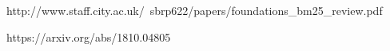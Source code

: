 
http://www.staff.city.ac.uk/~sbrp622/papers/foundations_bm25_review.pdf

https://arxiv.org/abs/1810.04805

